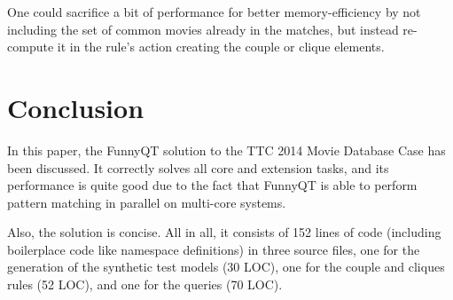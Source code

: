 \documentclass[a4paper]{article}
\begin{document}
One could sacrifice a bit of performance for better memory-efficiency by not
including the set of common movies already in the matches, but instead
re-compute it in the rule's action creating the couple or clique elements.


\section{Conclusion}
\label{sec:conclusion}

In this paper, the FunnyQT solution to the TTC 2014 Movie Database Case has
been discussed.  It correctly solves all core and extension tasks, and its
performance is quite good due to the fact that FunnyQT is able to perform
pattern matching in parallel on multi-core systems.

Also, the solution is concise.  All in all, it consists of 152 lines of code
(including boilerplace code like namespace definitions) in three source files,
one for the generation of the synthetic test models (30 LOC), one for the
couple and cliques rules (52 LOC), and one for the queries (70 LOC).




\end{document}
